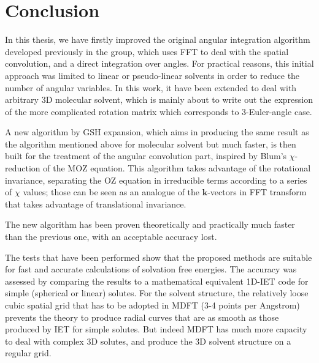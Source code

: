 
\chapter{Conclusion\label{chpt:conclusion}}

In this thesis, we have firstly improved the original angular integration
algorithm developed previously in the group, which uses \acs{FFT}
to deal with the spatial convolution, and a direct integration over
angles. For practical reasons, this initial approach was limited to
linear or pseudo-linear solvents in order to reduce the number of
angular variables. In this work, it have been extended to deal with
arbitrary 3D molecular solvent, which is mainly about to write out
the expression of the more complicated rotation matrix which corresponds
to 3-Euler-angle case. 

A new algorithm by \acf{GSH} expansion, which aims in producing the
same result as the algorithm mentioned above for molecular solvent
but much faster, is then built for the treatment of the angular convolution
part, inspired by Blum's $\chi$-reduction of the \acs{MOZ} equation.
This algorithm takes advantage of the rotational invariance, separating
the \acs{OZ} equation in irreducible terms according to a series
of $\chi$ values; those can be seen as an analogue of the $\mathbf{k}$-vectors
in \acs{FFT} transform that takes advantage of translational invariance.

The new algorithm has been proven theoretically and practically much
faster than the previous one, with an acceptable accuracy lost.

The tests that have been performed show that the proposed methods
are suitable for fast and accurate calculations of solvation free
energies. The accuracy was assessed by comparing the results to a
mathematical equivalent 1D-\acf{IET} code for simple (spherical or
linear) solutes. For the solvent structure, the relatively loose cubic
spatial grid that has to be adopted in \acf{MDFT} (3-4 points per
Angstrom) prevents the theory to produce radial curves that are as
smooth as those produced by \acs{IET} for simple solutes. But indeed
\acf{MDFT} has much more capacity to deal with complex 3D solutes,
and produce the 3D solvent structure on a regular grid.

